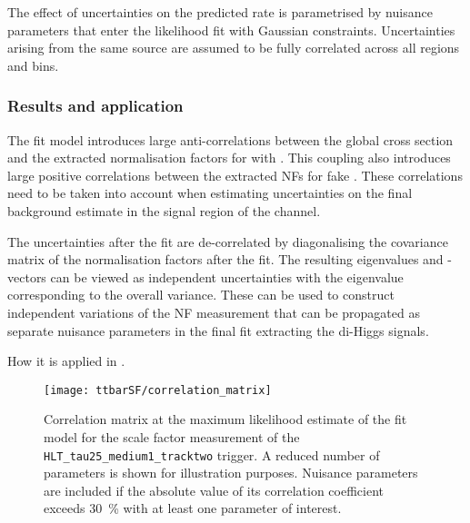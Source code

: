 The effect of uncertainties on the predicted rate is parametrised by
nuisance parameters that enter the likelihood fit with Gaussian
constraints. Uncertainties arising from the same source are assumed to
be fully correlated across all regions and bins.








\subsubsection{Results and application}

The fit model introduces large anti-correlations between the global
\ttbar cross section and the extracted normalisation factors for
\ttbar with \faketauhadvis. This coupling also introduces large
positive correlations between the extracted NFs for fake
\tauhadvis. These correlations need to be taken into account when
estimating uncertainties on the final background estimate in the
signal region of the \hadhad channel.

The uncertainties after the fit are de-correlated by diagonalising the
covariance matrix of the normalisation factors after the fit. The
resulting eigenvalues and -vectors can be viewed as independent
uncertainties with the eigenvalue corresponding to the overall
variance. These can be used to construct independent variations of the
NF measurement that can be propagated as separate nuisance parameters
in the final fit extracting the di-Higgs signals.

How it is applied in \hadhad.


\begin{figure}[htbp]
  \centering
  \texttt{[image: ttbarSF/correlation\_matrix]}

  \caption{Correlation matrix at the maximum likelihood estimate of
    the fit model for the scale factor measurement of the
    \texttt{HLT\_tau25\_medium1\_tracktwo} trigger. A reduced number
    of parameters is shown for illustration purposes. Nuisance
    parameters are included if the absolute value of its correlation
    coefficient exceeds \SI{30}{\percent} with at least one parameter
    of interest.}
\end{figure}


